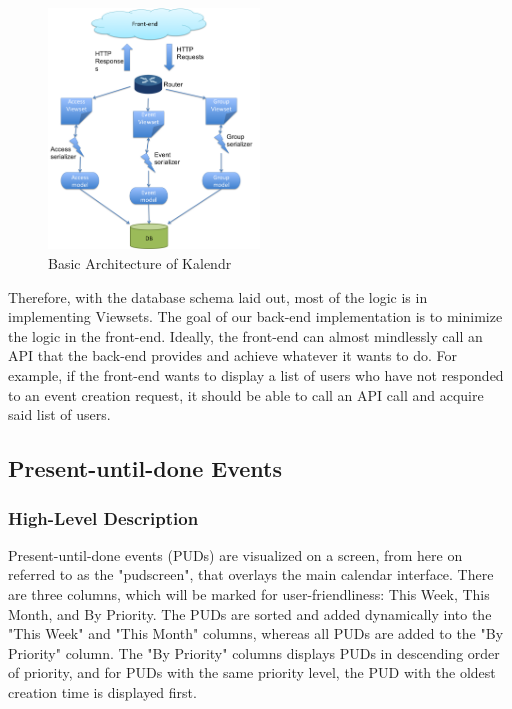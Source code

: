 \documentclass[a4paper]{article}
\begin{document}
\begin{figure}[h]
\centering
\includegraphics[width=0.5\textwidth]{basic_structure.png}
\caption{\label{fig:basicstructure}Basic Architecture of Kalendr}
\end{figure}

Therefore, with the database schema laid out, most of the logic is in implementing Viewsets. The goal of our back-end implementation is to minimize the logic in the front-end. Ideally, the front-end can almost mindlessly call an API that the back-end provides and achieve whatever it wants to do. For example, if the front-end wants to display a list of users who have not responded to an event creation request, it should be able to call an API call and acquire said list of users.

\subsection{Present-until-done Events}

\subsubsection{High-Level Description}

Present-until-done events (PUDs) are visualized on a screen, from here on referred to as the "pudscreen", that overlays the main calendar interface. There are three columns, which will be marked for user-friendliness: This Week, This Month, and By Priority. The PUDs are sorted and added dynamically into the "This Week" and "This Month" columns, whereas all PUDs are added to the "By Priority" column. The "By Priority" columns displays PUDs in descending order of priority, and for PUDs with the same priority level, the PUD with the oldest creation time is displayed first.
\end{document}

